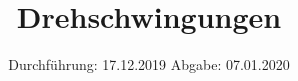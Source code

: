 

\subject{Versuch 102}
\title{Drehschwingungen}
\date{%
  Durchführung: 17.12.2019
  \hspace{3em}
  Abgabe: 07.01.2020
}



\maketitle

\thispagestyle{empty}
\tableofcontents
\newpage









\printbibliography{}


